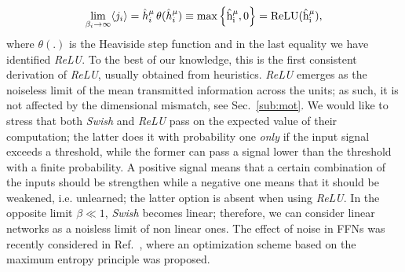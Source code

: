 \documentclass{article}
\begin{document}
%
\begin{equation} \label{eq:ps6}
\lim_{\beta_i \to \infty } \langle j_i \rangle =  \hat{h}^{\mu}_i \, \theta(\hat{h}^{\mu}_i)  \equiv   \rm{max} \left\{ \hat{h}^{\mu}_i, 0\right\} = ReLU(\hat{h}^{\mu}_i),
\end{equation}
%
where $\theta(.)$ is the Heaviside step function and in the last equality we have identified {\it ReLU}. To the best of our knowledge, this is the first consistent derivation of {\it ReLU}, usually obtained from heuristics. {\it ReLU} emerges as the noiseless limit of the mean transmitted information across the units; as such, it is not affected by the dimensional mismatch, see Sec.~\eqref{sub:mot}. We would like to stress that both {\it Swish} and {\it ReLU} pass on the expected value of their computation; the latter does it with probability one {\it only} if the input signal exceeds a threshold, while the former can pass a signal lower than the threshold with a finite probability. A positive signal means that a certain combination of the inputs should be strengthen while a negative one means that it should be weakened, i.e. unlearned; the latter option is absent when using {\it ReLU}. In the opposite limit $\beta \ll 1$, {\it Swish} becomes linear; therefore, we can consider linear networks as a noisless limit of non linear ones. The effect of noise in FFNs was recently considered in Ref.~\cite{pratik}, where an optimization scheme based on the maximum entropy principle was proposed.
%
\end{document}
